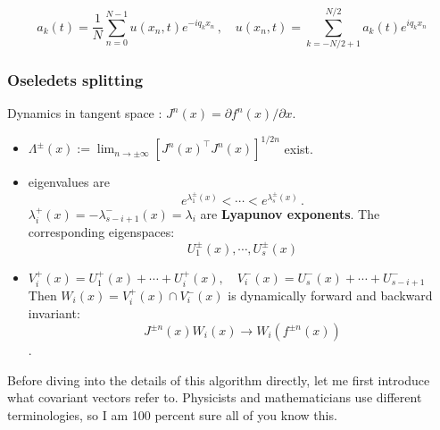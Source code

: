 \documentclass[mathserif, handout]{beamer}
\begin{document}
\begin{frame}[allowframebreaks]

  \[
  a_{k}(t)=\frac{1}{N}\sum_{n=0}^{N-1}u(x_{n},t)e^{-iq_{k}x_{n}}
  \,,\quad
  u(x_{n},t)=  \sum_{k=-N/2+1}^{N/2} a_{k}(t)e^{iq_{k}x_{n}}
  \]

\end{frame}

\begin{frame}
  \frametitle{Oseledets splitting~\cite{ruelle79}}
  Dynamics in tangent space : $J^n(x)=\partial f^n(x)/\partial x$.
  \begin{itemize}
  \item $\Lambda^{\pm}(x) :=\lim_{n\to\pm\infty}[J^n(x)^\top J^{n}(x)]^{1/2n}$
    exist.

  \item eigenvalues are
    \[
    e^{\lambda^{\pm}_1(x)}<\cdots<e^{\lambda^{\pm}_s(x)}
    \,.
    \]
    $\lambda^{+}_i(x)=-\lambda^{-}_{s-i+1}(x)=\lambda_i$ are
    \textbf{Lyapunov exponents}.
    The corresponding eigenspaces:
    \[U^\pm_1(x), \cdots, U^\pm_s(x)\]

    \pause
  \item
    $
    V^+_i(x)=U^+_1(x)+\cdots+U^+_i(x),\quad
    V^-_i(x)=U^-_s(x)+\cdots+U^-_{s-i+1}
    $
    Then
    {\color{green} $W_i(x)=V^+_i(x)\cap V^-_i(x)$} is
    dynamically {\color{red} forward}
    and {\color{red} backward} invariant:
    {\color{green}
      \[J^{\pm n}(x)W_i(x) \to W_i(f^{\pm n}(x))\].
    }
  \end{itemize}

   {
    Before diving into the details of this algorithm directly,
    let me first introduce what covariant vectors refer to.  Physicists
    and mathematicians use different terminologies, so I am 100 percent
    sure all of you know this.
  }

\end{frame}
\end{document}
